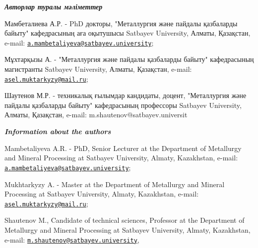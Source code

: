 \begin{authorinfo}
\emph{{\bfseries Авторлар туралы мәліметтер}}

Мамбеталиева А.Р. - PhD докторы, "Металлургия және пайдалы қазбаларды
байыту" кафедрасының аға оқытушысы Satbayev University, Алматы,
Қазақстан, e-mail:
\href{mailto:a.mambetaliyeva@satbayev.university}{\nolinkurl{a.mambetaliyeva@satbayev.university}};

Мұхтарқызы А. - "Металлургия және пайдалы қазбаларды байыту"
кафедрасының магистранты Satbayev University, Алматы, Қазақстан, e-mail:
\href{mailto:asel.muktarkyzy@mail.ru}{\nolinkurl{asel.muktarkyzy@mail.ru}};

Шаутенов М.Р. - техникалық ғылымдар кандидаты, доцент, "Металлургия және
пайдалы қазбаларды байыту" кафедрасының профессоры Satbayev University,
Алматы, Қазақстан, e-mail: m.shautenov@satbayev.universit

\emph{{\bfseries Information about the authors}}

Mambetaliyeva A.R. - PhD, Senior Lecturer at the Department of
Metallurgy and Mineral Processing at Satbayev University, Almaty,
Kazakhstan, e-mail:
\href{mailto:a.mambetaliyeva@satbayev.university}{\nolinkurl{a.mambetaliyeva@satbayev.university}};

Mukhtarkyzy A. - Master at the Department of Metallurgy and Mineral
Processing at Satbayev University, Almaty, Kazakhstan, e-mail:
\href{mailto:asel.muktarkyzy@mail.ru}{\nolinkurl{asel.muktarkyzy@mail.ru}};

Shautenov M., Candidate of technical sciences, Professor at the
Department of Metallurgy and Mineral Processing at Satbayev University,
Almaty, Kazakhstan, e-mail:
\href{mailto:m.shautenov@satbayev.university}{\nolinkurl{m.shautenov@satbayev.university}},
\end{authorinfo}

